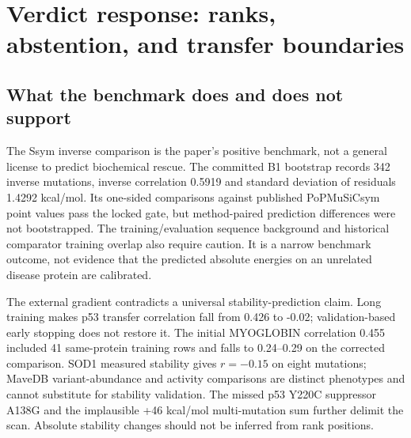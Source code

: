 \clearpage
\section{Verdict response: ranks, abstention, and transfer boundaries}
\subsection{What the benchmark does and does not support}
The Ssym inverse comparison is the paper's positive benchmark, not a general license to predict biochemical rescue. The committed B1 bootstrap records 342 inverse mutations, inverse correlation 0.5919 and standard deviation of residuals 1.4292 kcal/mol. Its one-sided comparisons against published PoPMuSiCsym point values pass the locked gate, but method-paired prediction differences were not bootstrapped. The training/evaluation sequence background and historical comparator training overlap also require caution. It is a narrow benchmark outcome, not evidence that the predicted absolute energies on an unrelated disease protein are calibrated.

The external gradient contradicts a universal stability-prediction claim. Long training makes p53 transfer correlation fall from 0.426 to -0.02; validation-based early stopping does not restore it. The initial MYOGLOBIN correlation 0.455 included 41 same-protein training rows and falls to 0.24--0.29 on the corrected comparison. SOD1 measured stability gives $r=-0.15$ on eight mutations; MaveDB variant-abundance and activity comparisons are distinct phenotypes and cannot substitute for stability validation. The missed p53 Y220C suppressor A138G and the implausible +46 kcal/mol multi-mutation sum further delimit the scan. Absolute stability changes should not be inferred from rank positions.

